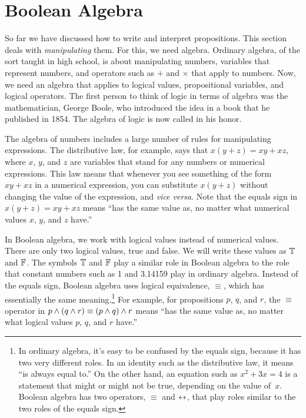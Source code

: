 \section{Boolean Algebra}\label{S-logic-2}

So far we have discussed how to write and interpret propositions.
This section deals with \emph{manipulating} them.  For this,
we need algebra.  Ordinary algebra, of the sort taught in high
school, is about manipulating numbers, variables that represent numbers,
and operators such as $+$ and $\times$ that apply to numbers.
Now, we need an algebra that applies to logical values, propositional
variables, and logical operators.  The first person to think of
logic in terms of algebra was the mathematician, George Boole,
who introduced the idea in a book that he
published in 1854.  The algebra of logic is now called 
 in his honor.

The algebra of numbers includes a large number of rules for
manipulating expressions.  The distributive law, for example,
says that $x(y+z)=xy+xz$, where $x$, $y$, and $z$ are variables
that stand for any numbers or numerical expressions.  This law
means that whenever you see something of the form $xy+xz$
in a numerical expression, you can substitute $x(y+z)$ without
changing the value of the expression, and \textit{vice versa}.  Note that
the equals sign in $x(y+z)=xy+xz$ means ``has the same value as,
no matter what numerical values $x$, $y$, and $z$ have.''

In Boolean algebra, we work with logical values instead of
numerical values.  There are only two logical values, true
and false.  We will write these values as $\mathbb{T}$ and $\mathbb{F}$.
The symbols $\mathbb{T}$ and $\mathbb{F}$ play a similar role in Boolean algebra
to the role that constant numbers such as 1 and 3.14159 play 
in ordinary algebra.  Instead of the equals sign, Boolean algebra
uses logical equivalence, $\equiv$, which has essentially the
same meaning.\footnote{In ordinary algebra, it's easy to be confused
by the equals sign, because it has two very different roles.
In an identity such as the distributive law, it means
``is always equal to.''  On the other hand, an equation such as $x^2+3x=4$ is
a statement that might or might not be true, depending on the value of~$x$.
Boolean algebra has two operators, $\equiv$ and $\leftrightarrow$, that play
roles similar to the two roles of the equals sign.}
For example, for propositions $p$, $q$, and $r$, the $\equiv$ operator
in $p\wedge(q\wedge r)\equiv(p\wedge q)\wedge r$ means ``has the same value as,
no matter what logical values $p$, $q$, and $r$ have.''

